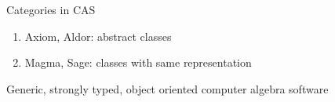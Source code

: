 \documentclass[final]{beamer}
\begin{document}
\begin{frame}[fragile]
\begin{columns}[t]
\begin{column}{.3\linewidth}
  \hfill
  \begin{block}{\large Categories in CAS}
  \scriptsize
  \begin{enumerate}
  \item Axiom, Aldor: abstract classes
  \item Magma, Sage: classes with same representation
  \end{enumerate}
  \end{block}
  \hfill
  \begin{block}{\large Generic, strongly typed, object oriented computer algebra software}
      \centering
  \end{block}
\end{column}


\begin{column}{.3\linewidth}
 

\end{column}
\end{columns}
\end{frame}
\end{document}
